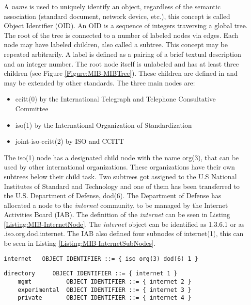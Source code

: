 A \textit{name} is used to uniquely identify an object, regardless of the semantic association (standard document, network device, etc.), this concept is called Object Identifier (OID). An OID is a sequence of integers traversing a global tree. The root of the tree is connected to a number of labeled nodes via edges. Each node may have labeled children, also called a subtree. This concept may be repeated arbitrarily. A label is defined as a pairing of a brief textual description and an integer number. The root node itself is unlabeled and has at least three children (see Figure \ref{Figure:MIB-MIBTree}). These children are defined in \cite{RFC:RFC1155:1990} and may be extended by other standards. The three main nodes are:

\begin{minipage}{\textwidth}
\begin{itemize}
    \item ccitt(0) by the International Telegraph and Telephone Consultative Committee
    \item iso(1) by the International Organization of Standardization
    \item joint-iso-ccitt(2) by ISO and CCITT
\end{itemize}
\end{minipage}


The iso(1) node has a designated child node with the name org(3), that can be used by other international organizations. These organizations have their own subtrees below their child task. Two subtrees got assigned to the U.S National Institutes of Standard and Technology and one of them has been transferred to the U.S. Department of Defense, dod(6). The Department of Defense has allocated a node to the \textit{internet} community, to be managed by the Internet Activities Board (IAB). The definition of the \textit{internet} can be seen in Listing \ref{Listing:MIB-InternetNode}. The \textit{internet} object can be identified as 1.3.6.1 or as .iso.org.dod.internet. The IAB also defined four subnodes of internet(1), this can be seen in Listing \ref{Listing:MIB-InternetSubNodes}.

\begin{lstlisting}[label=Listing:MIB-InternetNode,captionpos=b,caption={Definition of a node, internet node used as an example (from \cite{RFC:RFC1155:1990})}]
    internet   OBJECT IDENTIFIER ::= { iso org(3) dod(6) 1 }
\end{lstlisting}

\pagebreak
\begin{lstlisting}[label=Listing:MIB-InternetSubNodes,captionpos=b,caption={Definition of subnodes, internet subnodes used as an example (from \cite{RFC:RFC1155:1990})}]
    directory     OBJECT IDENTIFIER ::= { internet 1 }
    mgmt          OBJECT IDENTIFIER ::= { internet 2 }
    experimental  OBJECT IDENTIFIER ::= { internet 3 }
    private       OBJECT IDENTIFIER ::= { internet 4 }
\end{lstlisting}


